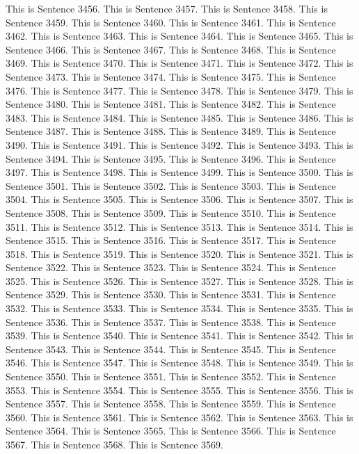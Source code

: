 \documentclass{article}
\begin{document}
This is Sentence 3456.
This is Sentence 3457.
This is Sentence 3458.
This is Sentence 3459.
This is Sentence 3460.
This is Sentence 3461.
This is Sentence 3462.
This is Sentence 3463.
This is Sentence 3464.
This is Sentence 3465.
This is Sentence 3466.
This is Sentence 3467.
This is Sentence 3468.
This is Sentence 3469.
This is Sentence 3470.
This is Sentence 3471.
This is Sentence 3472.
This is Sentence 3473.
This is Sentence 3474.
This is Sentence 3475.
This is Sentence 3476.
This is Sentence 3477.
This is Sentence 3478.
This is Sentence 3479.
This is Sentence 3480.
This is Sentence 3481.
This is Sentence 3482.
This is Sentence 3483.
This is Sentence 3484.
This is Sentence 3485.
This is Sentence 3486.
This is Sentence 3487.
This is Sentence 3488.
This is Sentence 3489.
This is Sentence 3490.
This is Sentence 3491.
This is Sentence 3492.
This is Sentence 3493.
This is Sentence 3494.
This is Sentence 3495.
This is Sentence 3496.
This is Sentence 3497.
This is Sentence 3498.
This is Sentence 3499.
This is Sentence 3500.
This is Sentence 3501.
This is Sentence 3502.
This is Sentence 3503.
This is Sentence 3504.
This is Sentence 3505.
This is Sentence 3506.
This is Sentence 3507.
This is Sentence 3508.
This is Sentence 3509.
This is Sentence 3510.
This is Sentence 3511.
This is Sentence 3512.
This is Sentence 3513.
This is Sentence 3514.
This is Sentence 3515.
This is Sentence 3516.
This is Sentence 3517.
This is Sentence 3518.
This is Sentence 3519.
This is Sentence 3520.
This is Sentence 3521.
This is Sentence 3522.
This is Sentence 3523.
This is Sentence 3524.
This is Sentence 3525.
This is Sentence 3526.
This is Sentence 3527.
This is Sentence 3528.
This is Sentence 3529.
This is Sentence 3530.
This is Sentence 3531.
This is Sentence 3532.
This is Sentence 3533.
This is Sentence 3534.
This is Sentence 3535.
This is Sentence 3536.
This is Sentence 3537.
This is Sentence 3538.
This is Sentence 3539.
This is Sentence 3540.
This is Sentence 3541.
This is Sentence 3542.
This is Sentence 3543.
This is Sentence 3544.
This is Sentence 3545.
This is Sentence 3546.
This is Sentence 3547.
This is Sentence 3548.
This is Sentence 3549.
This is Sentence 3550.
This is Sentence 3551.
This is Sentence 3552.
This is Sentence 3553.
This is Sentence 3554.
This is Sentence 3555.
This is Sentence 3556.
This is Sentence 3557.
This is Sentence 3558.
This is Sentence 3559.
This is Sentence 3560.
This is Sentence 3561.
This is Sentence 3562.
This is Sentence 3563.
This is Sentence 3564.
This is Sentence 3565.
This is Sentence 3566.
This is Sentence 3567.
This is Sentence 3568.
This is Sentence 3569.
\end{document}
